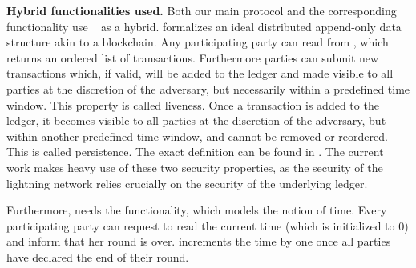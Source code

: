 
  \noindent \textbf{Hybrid functionalities used.}
    Both our main protocol and the corresponding functionality use
    \ledger~\cite{BMTZ17,genesis} as a hybrid. \ledger{} formalizes an ideal
    distributed append-only data structure akin to a blockchain. Any
    participating party can read from \ledger, which returns an ordered list
    of transactions. Furthermore parties can submit new transactions which, if
    valid, will be added to the ledger and made visible to all parties
    at the discretion of the adversary, but necessarily within a predefined time
    window. This property is called liveness. Once a transaction is added to the
    ledger, it becomes visible to all parties at the discretion of the
    adversary, but within another predefined time window, and cannot be removed
    or reordered. This is called persistence. The exact definition can be found
    in . The current work makes
    heavy use of these two security properties, as the security of the lightning
    network relies crucially on the security of the underlying ledger.

    Furthermore, \ledger{} needs the \Fclock functionality,
    which models the notion of time. Every participating party can request to
    read the current time (which is initialized to 0) and inform \Fclock that
    her round is over. \Fclock increments the time by one once all parties have
    declared the end of their round.

